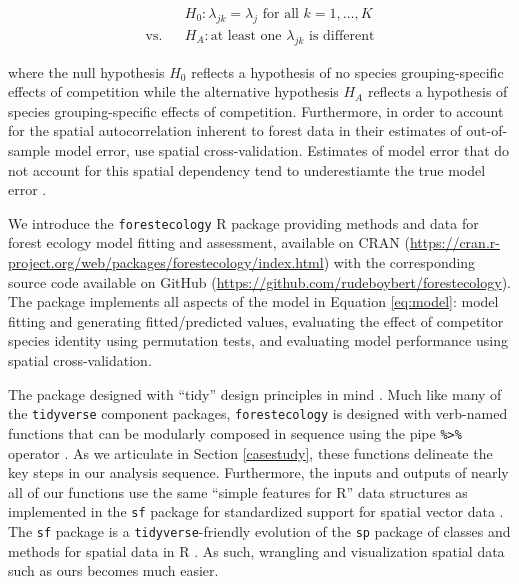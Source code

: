 \documentclass[12pt]{article}
\begin{document}
\begin{eqnarray}
\label{eq:permutation-hypothesis-test}
&&H_0: \lambda_{jk} = \lambda_{j} \mbox{ for all } k = 1, \ldots, K\\
\text{vs.}&&H_A: \text{at least one } \lambda_{jk} \mbox{ is different}
\end{eqnarray}

where the null hypothesis \(H_0\) reflects a hypothesis of no species
grouping-specific effects of competition while the alternative
hypothesis \(H_A\) reflects a hypothesis of species grouping-specific
effects of competition. Furthermore, in order to account for the spatial
autocorrelation inherent to forest data in their estimates of
out-of-sample model error, \citet{allen_permutation_2020} use spatial
cross-validation. Estimates of model error that do not account for this
spatial dependency tend to underestiamte the true model error
\citep{roberts_cross-validation_2017}.

We introduce the \texttt{forestecology} R package providing methods and
data for forest ecology model fitting and assessment, available on CRAN
(\url{https://cran.r-project.org/web/packages/forestecology/index.html})
with the corresponding source code available on GitHub
(\url{https://github.com/rudeboybert/forestecology}). The package
implements all aspects of the model in Equation \ref{eq:model}: model
fitting and generating fitted/predicted values, evaluating the effect of
competitor species identity using permutation tests, and evaluating
model performance using spatial cross-validation.

The package designed with ``tidy'' design principles in mind
\citep{wickham_welcome_2019}. Much like many of the \texttt{tidyverse}
component packages, \texttt{forestecology} is designed with verb-named
functions that can be modularly composed in sequence using the pipe
\texttt{\%\textgreater{}\%} operator \citep{bache_pipe_2020}. As we
articulate in Section \ref{casestudy}, these functions delineate the key
steps in our analysis sequence. Furthermore, the inputs and outputs of
nearly all of our functions use the same ``simple features for R'' data
structures as implemented in the \texttt{sf} package for standardized
support for spatial vector data \citep{pebesma_simple_2018}. The
\texttt{sf} package is a \texttt{tidyverse}-friendly evolution of the
\texttt{sp} package of classes and methods for spatial data in R
\citep{pebesma_sp_2005}. As such, wrangling and visualization spatial
data such as ours becomes much easier.
\end{document}
